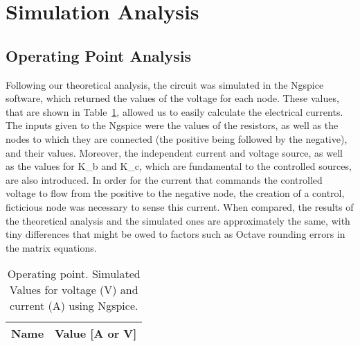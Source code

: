 \section{Simulation Analysis}
\label{sec:simulation}

\subsection{Operating Point Analysis}

Following our theoretical analysis, the circuit was simulated in the Ngspice software, which returned the values of the voltage for each node. These values, that are shown in Table~\ref{tab:op}, allowed us to easily calculate the electrical currents. 
The inputs given to the Ngspice were the values of the resistors, as well as the nodes to which they are connected (the positive being followed by the negative), and their values. Moreover, the independent current and voltage source, as well as the values for K_b and K_c, which are fundamental to the controlled sources, are also introduced. 
In order for the current that commands the controlled voltage to flow from the positive to the negative node, the creation of a control, ficticious node was necessary to sense this current.
When compared, the results of the theoretical analysis and the simulated ones are approximately the same, with tiny differences that might be owed to factors such as Octave rounding errors in the matrix equations.

\begin{table}[h]
  \centering
  \begin{tabular}{|l|r|}
    \hline    
    {\bf Name} & {\bf Value [A or V]} \\ \hline
    
  \end{tabular}
  \caption{Operating point. Simulated Values for voltage (V) and current (A) using Ngspice.}
  \label{tab:op}
\end{table}




